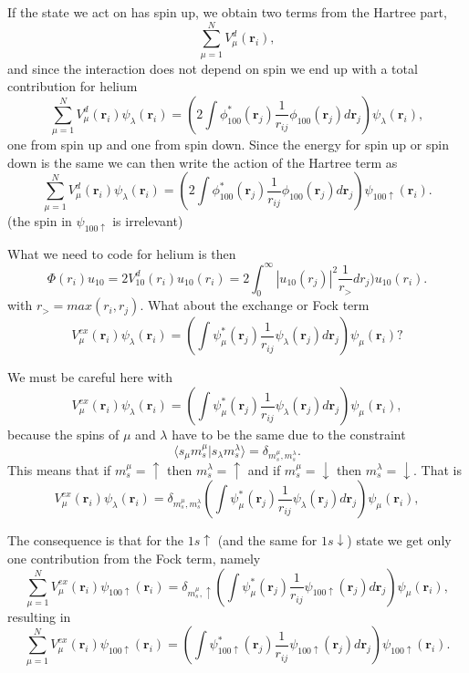 If the state we act on has spin up, we obtain two terms  from the Hartree part,  
\[
  \sum_{\mu=1}^NV_{\mu}^{d}(\mathbf{r}_i),
\]
and since the interaction does not depend on spin we end up with
a total contribution for helium
\[
  \sum_{\mu=1}^NV_{\mu}^{d}(\mathbf{r}_i)\psi_{\lambda}(\mathbf{r}_i)=\left(2\int \phi_{100}^*(\mathbf{r}_j) 
  \frac{1}{r_{ij}}\phi_{100}(\mathbf{r}_j) d\mathbf{r}_j\right)\psi_{\lambda}(\mathbf{r}_i),
\] 
one from spin up and one from spin down.  
Since the energy for spin up or spin down is the same we can then write the action of the Hartree term as
\[
  \sum_{\mu=1}^NV_{\mu}^{d}(\mathbf{r}_i)\psi_{\lambda}(\mathbf{r}_i)=\left(2\int \phi_{100}^*(\mathbf{r}_j) 
  \frac{1}{r_{ij}}\phi_{100}(\mathbf{r}_j) d\mathbf{r}_j\right)\psi_{100\uparrow}(\mathbf{r}_i).
\] 
(the spin in $\psi_{100\uparrow}$ is irrelevant)

What we need to code for helium is then 
\[
\Phi(r_i)u_{10}= 2V_{10}^d(r_i)u_{10}(r_i) = 2\int_0^{\infty}|u_{10}(r_j)|^2\frac{1}{r_{>}}dr_j)u_{10}(r_i).
\]
with $ r_{>} = max(r_i,r_j)$.
What about the exchange or Fock term
\begin{equation*}
  V_{\mu}^{ex}(\mathbf{r}_i) \psi_{\lambda}(\mathbf{r}_i) 
  = \left(\int \psi_{\mu}^*(\mathbf{r}_j) 
  \frac{1}{r_{ij}}\psi_{\lambda}(\mathbf{r}_j) d\mathbf{r}_j
  \right)\psi_{\mu}(\mathbf{r}_i)?
\end{equation*}

We must be careful here with
\begin{equation*}
  V_{\mu}^{ex}(\mathbf{r}_i) \psi_{\lambda}(\mathbf{r}_i) 
  = \left(\int \psi_{\mu}^*(\mathbf{r}_j) 
  \frac{1}{r_{ij}}\psi_{\lambda}(\mathbf{r}_j) d\mathbf{r}_j
  \right)\psi_{\mu}(\mathbf{r}_i),
\end{equation*}
because the spins of $\mu$ and $\lambda$ have to be the same due to the
constraint
\[
 \langle s_{\mu} m_s^{\mu} |  s_{\lambda} m_s^{\lambda} \rangle = \delta_{m_s^{\mu},m_s^{\lambda}}.
\]
This means that if $m_s^{\mu}=\uparrow$ then   $m_s^{\lambda}=\uparrow$ and if 
$m_s^{\mu}=\downarrow$ then   $m_s^{\lambda}=\downarrow$.   That is
\begin{equation*}
  V_{\mu}^{ex}(\mathbf{r}_i) \psi_{\lambda}(\mathbf{r}_i) 
  = \delta_{m_s^{\mu},m_s^{\lambda}}\left(\int \psi_{\mu}^*(\mathbf{r}_j) 
  \frac{1}{r_{ij}}\psi_{\lambda}(\mathbf{r}_j) d\mathbf{r}_j
  \right)\psi_{\mu}(\mathbf{r}_i),
\end{equation*}

The consequence is that for the $1s\uparrow$ (and the same for $1s\downarrow$) state we get only one contribution  from the Fock 
term, namely
\[
  \sum_{\mu=1}^NV_{\mu}^{ex}(\mathbf{r}_i) \psi_{100\uparrow}(\mathbf{r}_i) 
  = \delta_{m_s^{\mu},\uparrow}\left(\int \psi_{\mu}^*(\mathbf{r}_j) 
  \frac{1}{r_{ij}}\psi_{100\uparrow}(\mathbf{r}_j) d\mathbf{r}_j
  \right)\psi_{\mu}(\mathbf{r}_i),
\]
resulting in 
\[
  \sum_{\mu=1}^NV_{\mu}^{ex}(\mathbf{r}_i) \psi_{100\uparrow}(\mathbf{r}_i) 
  = \left(\int \psi_{100\uparrow}^*(\mathbf{r}_j) 
  \frac{1}{r_{ij}}\psi_{100\uparrow}(\mathbf{r}_j) d\mathbf{r}_j
  \right)\psi_{100\uparrow}(\mathbf{r}_i).
\]

